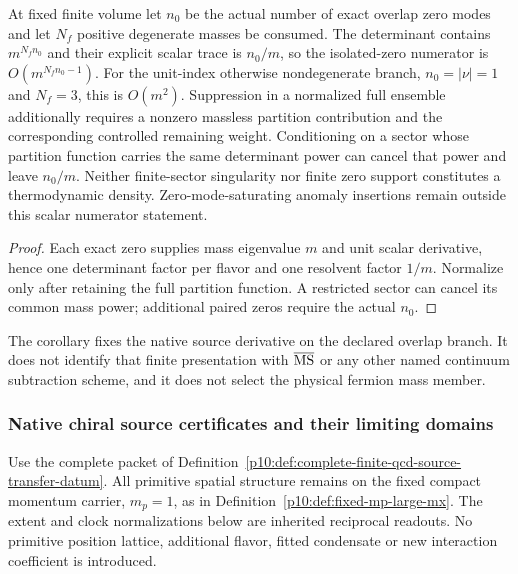 \documentclass[12pt,a4paper]{article}
\begin{document}
\begin{corollary}
\label{p10:cor:v2158-finite-volume-zero-mode-firewall}
At fixed finite volume let $n_0$ be the actual number of exact overlap
zero modes and let $N_f$ positive degenerate masses be consumed.
The determinant contains $m^{N_fn_0}$ and their explicit scalar
trace is $n_0/m$, so the isolated-zero numerator is
$O(m^{N_fn_0-1})$. For the unit-index otherwise nondegenerate
branch, $n_0=|\nu|=1$ and $N_f=3$, this is $O(m^2)$.
Suppression in a normalized full ensemble additionally requires a
nonzero massless partition contribution and the corresponding
controlled remaining weight. Conditioning on a sector whose
partition function carries the same determinant power can cancel
that power and leave $n_0/m$. Neither finite-sector singularity
nor finite zero support constitutes a thermodynamic density.
Zero-mode-saturating anomaly insertions remain outside this scalar
numerator statement.
\end{corollary}
\begin{proof}
Each exact zero supplies mass eigenvalue $m$ and unit scalar
derivative, hence one determinant factor per flavor and one
resolvent factor $1/m$. Normalize only after retaining the full
partition function. A restricted sector can cancel its common
mass power; additional paired zeros require the actual $n_0$.
\end{proof}

\begin{remark}[Scope]
\label{p10:rem:v165-overlap-scalar-source-scope}
The corollary fixes the native source derivative on the declared overlap
branch.  It does not identify that finite presentation with
$\overline{\rm MS}$ or any other named continuum subtraction scheme, and it
does not select the physical fermion mass member.
\end{remark}



\subsubsection{Native chiral source certificates and their limiting domains}
\label{p10:sec:chiral-source-certificates}
Use the complete packet of
Definition~\ref{p10:def:complete-finite-qcd-source-transfer-datum}.
All primitive spatial structure remains on the fixed compact momentum
carrier, $m_p=1$, as in Definition~\ref{p10:def:fixed-mp-large-mx}.
The extent and clock normalizations below are inherited reciprocal
readouts. No primitive position lattice, additional flavor, fitted
condensate or new interaction coefficient is introduced.
\end{document}
